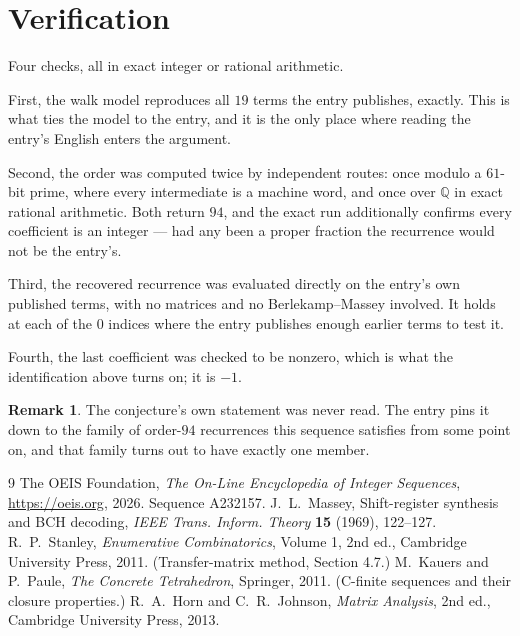 \documentclass[11pt,a4paper]{article}
\theoremstyle{plain}
\theoremstyle{definition}
\newtheorem{remark}[theorem]{Remark}
\begin{document}
\section{Verification}

Four checks, all in exact integer or rational arithmetic.

First, the walk model reproduces all $19$ terms the entry publishes, exactly. This is
what ties the model to the entry, and it is the only place where reading the entry's English
enters the argument.

Second, the order was computed twice by independent routes: once modulo a $61$-bit prime, where
every intermediate is a machine word, and once over $\mathbb{Q}$ in exact rational arithmetic.
Both return $94$, and the exact run additionally confirms every coefficient is an integer
--- had any been a proper fraction the recurrence would not be the entry's.

Third, the recovered recurrence was evaluated directly on the entry's own published terms, with
no matrices and no Berlekamp--Massey involved. It holds at each of the $0$ indices where
the entry publishes enough earlier terms to test it.

Fourth, the last coefficient was checked to be nonzero, which is what the identification above
turns on; it is $-1$.

\begin{remark}
The conjecture's own statement was never read. The entry pins it down to the family of
order-$94$ recurrences this sequence satisfies from some point on, and that family turns
out to have exactly one member.
\end{remark}

\begin{thebibliography}{9}
 The OEIS Foundation, \emph{The On-Line Encyclopedia of Integer
Sequences}, \url{https://oeis.org}, 2026. Sequence A232157.
 J.~L.~Massey, Shift-register synthesis and BCH decoding, \emph{IEEE
Trans. Inform. Theory} \textbf{15} (1969), 122--127.
 R.~P.~Stanley, \emph{Enumerative Combinatorics}, Volume 1, 2nd ed.,
Cambridge University Press, 2011. (Transfer-matrix method, Section 4.7.)
 M.~Kauers and P.~Paule, \emph{The Concrete Tetrahedron}, Springer, 2011.
(C-finite sequences and their closure properties.)
 R.~A.~Horn and C.~R.~Johnson, \emph{Matrix Analysis}, 2nd ed., Cambridge
University Press, 2013.
\end{thebibliography}
\end{document}
